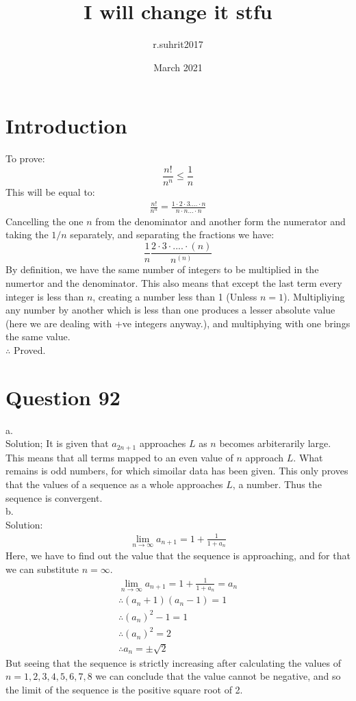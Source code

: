 \documentclass{article}
\title{I will change it stfu}
\author{r.suhrit2017 }
\date{March 2021}
\begin{document}
\maketitle

\section{Introduction}
To prove:$$\frac{n!}{n^n}\leq \frac{1}{n}$$
This will be equal to:
\begin{gather}
\frac{n!}{n^n}=\frac{1\cdot 2\cdot 3 .... \cdot n}{n\cdot n ...\cdot n}
\end{gather}
Cancelling the one $n$ from the denominator and another form the numerator and taking the $1/n$ separately, and separating the fractions we have:
$$\frac{1}{n}\frac{2\cdot 3\cdot .... \cdot (n)}{n^{(n)}}$$
By definition, we have the same number of integers to be multiplied in the numertor and the denominator. This also means that except the last term every integer is less than $n$, creating a number less than 1 (Unless $n=1$). Multipliying any number by another which is less than one produces a lesser absolute value (here we are dealing with +ve integers anyway.), and multiphying with one brings the same value.
\\$\therefore$ Proved.

\section{Question 92}
a.
\\Solution; It is given that $a_{2n+1}$ approaches $L$ as $n$ becomes arbiterarily large. This means that all terms mapped to an even value of $n$ approach $L$. What remains is odd numbers, for which simoilar data has been given. This only proves that the values of a sequence as a whole approaches $L$, a number. Thus the sequence is convergent.
\\b.
\\Solution:
\begin{gather*}
\lim_{n\to\infty}a_{n+1}=1+\frac{1}{1+a_{n}}
\end{gather*}
Here, we have to find out the value that the sequence is approaching, and for that we can substitute $n=\infty$.
\begin{gather*}
\lim_{n\to\infty}a_{n+1}=1+\frac{1}{1+a_{n}}=a_{n}
\\\therefore (a_n+1)(a_n-1)=1
\\\therefore ({a_{n}})^2-1=1
\\\therefore ({a_{n}})^2=2
\\\therefore {a_{n}}=\pm \sqrt{2}
\end{gather*}
But seeing that the sequence is strictly increasing after calculating the values of $n=1,2,3,4,5,6,7,8$ we can conclude that the value cannot be negative, and so the limit of the sequence is the positive square root of 2.
\end{document}
